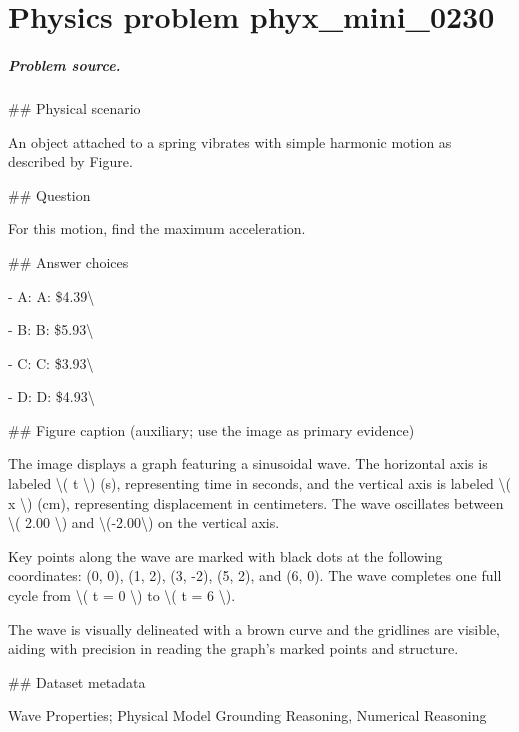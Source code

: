 
\chapter{Physics problem phyx\_mini\_0230}
\label{ch:PhyXMiniProblems_problem_phyx_mini_0230}

\paragraph{Problem source.}
\#\# Physical scenario

An object attached to a spring vibrates with simple harmonic motion as described by Figure.

\#\# Question

For this motion, find the maximum acceleration.

\#\# Answer choices

- A: A: \$4.39\textbackslash{}

- B: B: \$5.93\textbackslash{}

- C: C: \$3.93\textbackslash{}

- D: D: \$4.93\textbackslash{}

\#\# Figure caption (auxiliary; use the image as primary evidence)

The image displays a graph featuring a sinusoidal wave. The horizontal axis is labeled \textbackslash{}( t \textbackslash{}) (s), representing time in seconds, and the vertical axis is labeled \textbackslash{}( x \textbackslash{}) (cm), representing displacement in centimeters. The wave oscillates between \textbackslash{}( 2.00 \textbackslash{}) and \textbackslash{}(-2.00\textbackslash{}) on the vertical axis.

Key points along the wave are marked with black dots at the following coordinates: (0, 0), (1, 2), (3, -2), (5, 2), and (6, 0). The wave completes one full cycle from \textbackslash{}( t = 0 \textbackslash{}) to \textbackslash{}( t = 6 \textbackslash{}).

The wave is visually delineated with a brown curve and the gridlines are visible, aiding with precision in reading the graph's marked points and structure.

\#\# Dataset metadata

Wave Properties; Physical Model Grounding Reasoning, Numerical Reasoning

